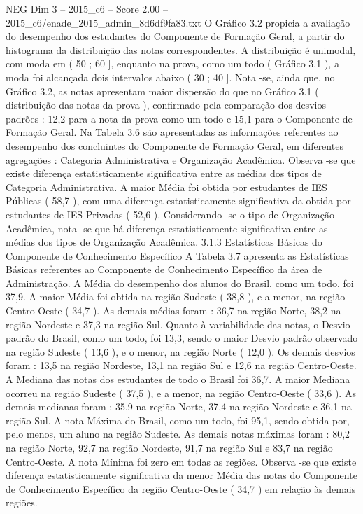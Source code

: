 \begin{textsample}{NEG Dim 3 – 2015\_c6 – Score 2.00 – 2015\_c6/enade\_2015\_admin\_8d6df9fa83.txt}
O Gráfico 3.2 propicia a avaliação do desempenho dos estudantes do Componente de Formação Geral, a partir do histograma da distribuição das notas correspondentes.
A distribuição é unimodal, com moda em ( 50 ; 60 ], enquanto na prova, como um todo ( Gráfico 3.1 ), a moda foi alcançada dois intervalos abaixo ( 30 ; 40 ].
Nota -se, ainda que, no Gráfico 3.2, as notas apresentam maior dispersão do que no Gráfico 3.1 ( distribuição das notas da prova ), confirmado pela comparação dos desvios padrões : 12,2 para a nota da prova como um todo e 15,1 para o Componente de Formação Geral.
Na Tabela 3.6 são apresentadas as informações referentes ao desempenho dos concluintes do Componente de Formação Geral, em diferentes agregações : Categoria Administrativa e Organização Acadêmica.
Observa -se que existe diferença estatisticamente significativa entre as médias dos tipos de Categoria Administrativa.
A maior Média foi obtida por estudantes de IES Públicas ( 58,7 ), com uma diferença estatisticamente significativa da obtida por estudantes de IES Privadas ( 52,6 ).
Considerando -se o tipo de Organização Acadêmica, nota -se que há diferença estatisticamente significativa entre as médias dos tipos de Organização Acadêmica. 3.1.3 Estatísticas Básicas do Componente de Conhecimento Específico A Tabela 3.7 apresenta as Estatísticas Básicas referentes ao Componente de Conhecimento Específico da área de Administração.
A Média do desempenho dos alunos do Brasil, como um todo, foi 37,9.
A maior Média foi obtida na região Sudeste ( 38,8 ), e a menor, na região Centro-Oeste ( 34,7 ).
As demais médias foram : 36,7 na região Norte, 38,2 na região Nordeste e 37,3 na região Sul.
Quanto à variabilidade das notas, o Desvio padrão do Brasil, como um todo, foi 13,3, sendo o maior Desvio padrão observado na região Sudeste ( 13,6 ), e o menor, na região Norte ( 12,0 ).
Os demais desvios foram : 13,5 na região Nordeste, 13,1 na região Sul e 12,6 na região Centro-Oeste.
A Mediana das notas dos estudantes de todo o Brasil foi 36,7.
A maior Mediana ocorreu na região Sudeste ( 37,5 ), e a menor, na região Centro-Oeste ( 33,6 ).
As demais medianas foram : 35,9 na região Norte, 37,4 na região Nordeste e 36,1 na região Sul.
A nota Máxima do Brasil, como um todo, foi 95,1, sendo obtida por, pelo menos, um aluno na região Sudeste.
As demais notas máximas foram : 80,2 na região Norte, 92,7 na região Nordeste, 91,7 na região Sul e 83,7 na região Centro-Oeste.
A nota Mínima foi zero em todas as regiões.
Observa -se que existe diferença estatisticamente significativa da menor Média das notas do Componente de Conhecimento Específico da região Centro-Oeste ( 34,7 ) em relação às demais regiões.

\end{textsample}
